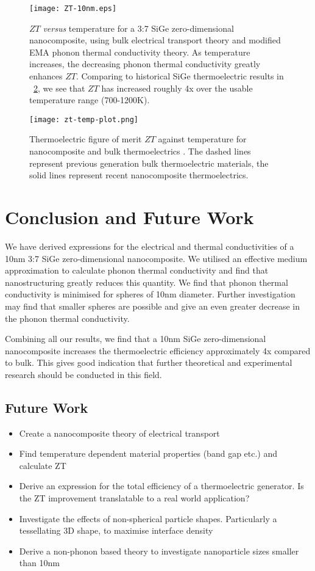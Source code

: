 \documentclass[12pt]{article}
\newcommand{\figref}[2][\figurename~]{#1\ref{#2}}
\newcommand{\tms}{\textsf{x} }
\begin{document}
\begin{figure}
	\centering
	\texttt{[image: ZT-10nm.eps]}
	\caption{$ZT$ \emph{versus} temperature for a 3:7 SiGe zero-dimensional nanocomposite, using bulk electrical transport theory and modified EMA \cite{mema} phonon thermal conductivity theory. As temperature increases, the decreasing phonon thermal conductivity greatly enhances $ZT$. Comparing to historical SiGe thermoelectric results in \figref{zt-plot}, we see that $ZT$ has increased roughly 4\tms over the usable temperature range (700-1200K).}
	\label{fig:zt-10nm}
\end{figure}

\begin{figure}
	\centering
	\texttt{[image: zt-temp-plot.png]}
	\caption{Thermoelectric figure of merit $ZT$ against temperature for nanocomposite and bulk thermoelectrics \cite{minnich-review}. The dashed lines represent previous generation bulk thermoelectric materials, the solid lines represent recent nanocomposite thermoelectrics.}
	\label{zt-plot}
\end{figure}

\pagebreak

\section{Conclusion and Future Work}
We have derived expressions for the electrical and thermal conductivities of a 10nm 3:7 SiGe zero-dimensional nanocomposite. We utilised an effective medium approximation to calculate phonon thermal conductivity and find that nanostructuring greatly reduces this quantity. We find that phonon thermal conductivity is minimised for spheres of 10nm diameter. Further investigation may find that smaller spheres are possible and give an even greater decrease in the phonon thermal conductivity.

Combining all our results, we find that a 10nm SiGe zero-dimensional nanocomposite increases the thermoelectric efficiency approximately 4\tms compared to bulk. This gives good indication that further theoretical and experimental research should be conducted in this field.

\subsection{Future Work}
\begin{itemize}
  \item Create a nanocomposite theory of electrical transport
  \item Find temperature dependent material properties (band gap etc.) and calculate ZT
  \item Derive an expression for the total efficiency of a thermoelectric generator. Is the ZT improvement translatable to a real world application?
  \item Investigate the effects of non-spherical particle shapes. Particularly a tessellating 3D shape, to maximise interface density
  \item Derive a non-phonon based theory to investigate nanoparticle sizes smaller than 10nm
\end{itemize}
\end{document}

